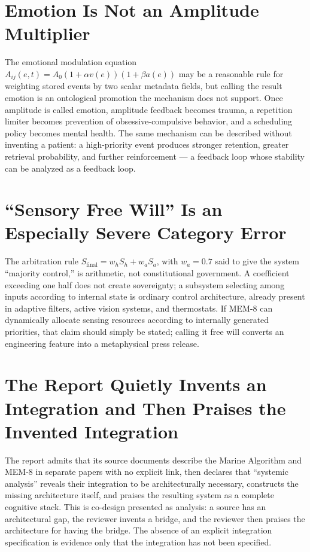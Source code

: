\documentclass[12pt]{article}
\begin{document}
\section{Emotion Is Not an Amplitude Multiplier}

The emotional modulation equation $A_{ij}(e,t)=A_0(1+\alpha v(e))(1+\beta a(e))$ may be a reasonable rule for weighting stored events by two scalar metadata fields, but calling the result emotion is an ontological promotion the mechanism does not support. Once amplitude is called emotion, amplitude feedback becomes trauma, a repetition limiter becomes prevention of obsessive-compulsive behavior, and a scheduling policy becomes mental health. The same mechanism can be described without inventing a patient: a high-priority event produces stronger retention, greater retrieval probability, and further reinforcement — a feedback loop whose stability can be analyzed as a feedback loop.

\section{``Sensory Free Will'' Is an Especially Severe Category Error}

The arbitration rule $S_{\text{final}}=w_hS_h+w_aS_a$, with $w_a=0.7$ said to give the system ``majority control,'' is arithmetic, not constitutional government. A coefficient exceeding one half does not create sovereignty; a subsystem selecting among inputs according to internal state is ordinary control architecture, already present in adaptive filters, active vision systems, and thermostats. If MEM-8 can dynamically allocate sensing resources according to internally generated priorities, that claim should simply be stated; calling it free will converts an engineering feature into a metaphysical press release.

\section{The Report Quietly Invents an Integration and Then Praises the Invented Integration}

The report admits that its source documents describe the Marine Algorithm and MEM-8 in separate papers with no explicit link, then declares that ``systemic analysis'' reveals their integration to be architecturally necessary, constructs the missing architecture itself, and praises the resulting system as a complete cognitive stack. This is co-design presented as analysis: a source has an architectural gap, the reviewer invents a bridge, and the reviewer then praises the architecture for having the bridge. The absence of an explicit integration specification is evidence only that the integration has not been specified.
\end{document}
